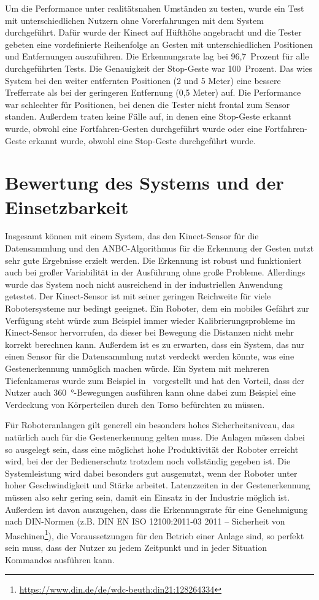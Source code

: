 Um die Performance unter realitätsnahen Umständen zu testen, wurde ein Test mit unterschiedlichen Nutzern ohne Vorerfahrungen mit dem System durchgeführt. Dafür wurde der Kinect auf Hüfthöhe angebracht und die Tester gebeten eine vordefinierte Reihenfolge an Gesten mit unterschiedlichen Positionen und Entfernungen auszuführen. Die Erkennungsrate lag bei 96,7~Prozent für alle durchgeführten Tests. Die Genauigkeit der Stop-Geste war 100~Prozent. Das wies System bei den weiter entfernten Positionen (2 und 5 Meter) eine bessere Trefferrate als bei der geringeren Entfernung (0,5 Meter) auf. Die Performance war schlechter für Positionen, bei denen die Tester nicht frontal zum Sensor standen. Außerdem traten keine Fälle auf, in denen eine Stop-Geste erkannt wurde, obwohl eine Fortfahren-Gesten durchgeführt wurde oder eine Fortfahren-Geste erkannt wurde, obwohl eine Stop-Geste durchgeführt wurde.~\cite{flexibleSystem}

\section{Bewertung des Systems und der Einsetzbarkeit}
Insgesamt können mit einem System, das den Kinect-Sensor für die Datensammlung und den ANBC-Algorithmus für die Erkennung der Gesten nutzt sehr gute Ergebnisse erzielt werden. Die Erkennung ist robust und funktioniert auch bei großer Variabilität in der Ausführung ohne große Probleme. Allerdings wurde das System noch nicht ausreichend in der industriellen Anwendung getestet. Der Kinect-Sensor ist mit seiner geringen Reichweite für viele Robotersysteme nur bedingt geeignet. Ein Roboter, dem ein mobiles Gefährt zur Verfügung steht würde zum Beispiel immer wieder Kalibrierungsprobleme im Kinect-Sensor hervorrufen, da dieser bei Bewegung die Distanzen nicht mehr korrekt berechnen kann. Außerdem ist es zu erwarten, dass ein System, das nur einen Sensor für die Datensammlung nutzt verdeckt werden könnte, was eine Gestenerkennung unmöglich machen würde. Ein System mit mehreren Tiefenkameras wurde zum Beispiel in~\cite{multipleDepthCameras} vorgestellt und hat den Vorteil, dass der Nutzer auch \SI{360}{\degree}-Bewegungen ausführen kann ohne dabei zum Beispiel eine Verdeckung von Körperteilen durch den Torso befürchten zu müssen.

Für Roboteranlangen gilt generell ein besonders hohes Sicherheitsniveau, das natürlich auch für die Gestenerkennung gelten muss. Die Anlagen müssen dabei so ausgelegt sein, dass eine möglichst hohe Produktivität der Roboter erreicht wird, bei der der Bedienerschutz trotzdem noch vollständig gegeben ist. Die Systemleistung wird dabei besonders gut ausgenutzt, wenn der Roboter unter hoher Geschwindigkeit und Stärke arbeitet. Latenzzeiten in der Gestenerkennung müssen also sehr gering sein, damit ein Einsatz in der Industrie möglich ist. Außerdem ist davon auszugehen, dass die Erkennungsrate für eine Genehmigung nach DIN-Normen (z.B. DIN EN ISO 12100:2011-03 2011 -- Sicherheit von Maschinen\footnote{\url{https://www.din.de/de/wdc-beuth:din21:128264334}}), die Voraussetzungen für den Betrieb einer Anlage sind, so perfekt sein muss, dass der Nutzer zu jedem Zeitpunkt und in jeder Situation Kommandos ausführen kann.~\cite{ObererTreitz.2019}
